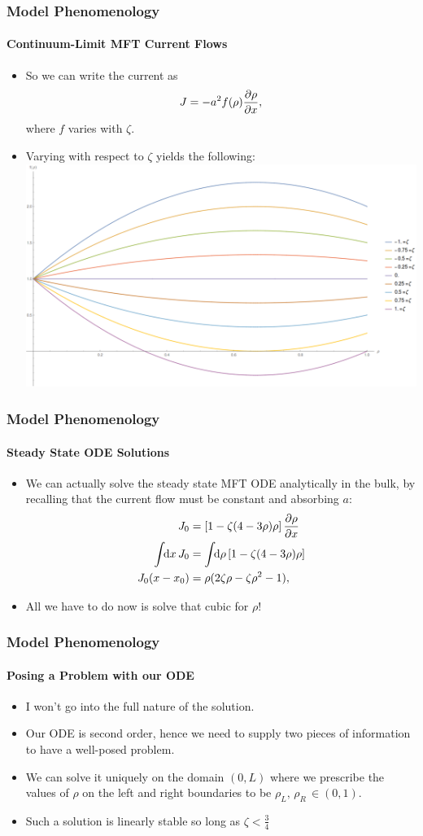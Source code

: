 \documentclass{beamer}
\begin{document}
\begin{frame}
\frametitle{Model Phenomenology}
\framesubtitle{Continuum-Limit MFT Current Flows}
\begin{itemize}
 \item So we can write the current as
 \begin{equation*}
  J = -a^2 f(\rho) \frac{\partial \rho}{\partial x},
 \end{equation*}
where $f$ varies with $\zeta$.
\item Varying with respect to $\zeta$ yields the following:
\includegraphics[width=0.75\linewidth]{images/currentFlows}
\end{itemize}
\end{frame}

\begin{frame}
 \frametitle{Model Phenomenology}
 \framesubtitle{Steady State ODE Solutions}
 \begin{itemize}
  \item We can actually solve the steady state MFT ODE analytically in the bulk, by recalling that the current flow must be constant and absorbing $a$:
  \begin{align*}
   J_0 &= \left[ 1 - \zeta (4-3\rho)\rho \right] \frac{\partial \rho}{\partial x} \\
   \int \! \! \mathrm{d}x \, J_0 &=  \int \! \! \mathrm{d}\rho \left[ 1 - \zeta (4-3\rho)\rho \right] \\
   J_0 (x-x_0) &= \rho (2\zeta \rho - \zeta \rho^2 -1  ),
  \end{align*}
\item All we have to do now is solve that cubic for $\rho$!
 \end{itemize}
\end{frame}

\begin{frame}
\frametitle{Model Phenomenology}
\framesubtitle{Posing a Problem with our ODE}
 \begin{itemize}
  \item I won't go into the full nature of the solution.
  \item Our ODE is second order, hence we need to supply two pieces of information to have a well-posed problem.
  \item We can solve it uniquely on the domain $(0, L)$ where we prescribe the values of $\rho$ on the left and right boundaries to be $\rho_L, \, \rho_R \, \in (0, 1)$.
  \item Such a solution is linearly stable so long as $\zeta < \frac{3}{4}$
 \end{itemize}
\end{frame}
\end{document}
